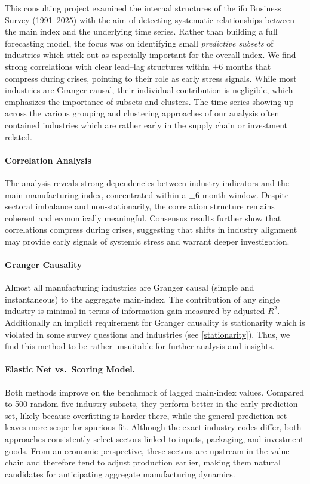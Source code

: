 This consulting project examined the internal structures of the ifo Business Survey (1991–2025) with the aim of detecting systematic relationships between the main index and the underlying time series. Rather than building a full forecasting model, the focus was on identifying small \emph{predictive subsets} of industries which stick out as especially important for the overall index. We find strong correlations with clear lead–lag structures within $\pm6$ months that compress during crises, pointing to their role as early stress signals. While most industries are Granger causal, their individual contribution is negligible, which emphasizes the importance of subsets and clusters. The time series showing up across the various grouping and clustering approaches of our analysis often contained industries which are rather early in the supply chain or investment related. 

\paragraph{Correlation Analysis}
The analysis reveals strong dependencies between industry indicators and the main manufacturing index, concentrated within a $\pm6$ month window. Despite sectoral imbalance and non-stationarity, the correlation structure remains coherent and economically meaningful. Consensus results further show that correlations compress during crises, suggesting that shifts in industry alignment may provide early signals of systemic stress and warrant deeper investigation.

\paragraph{Granger Causality}
Almost all manufacturing industries are Granger causal (simple and instantaneous) to the aggregate main-index. The contribution of any single industry is minimal in terms of information gain measured by adjusted $R^2$. Additionally an implicit requirement for Granger causality is stationarity which is violated in some survey questions and industries (see \ref{stationarity}). Thus, we find this method to be rather unsuitable for further analysis and insights. 

\paragraph{Elastic Net vs.\ Scoring Model.}
Both methods improve on the benchmark of lagged main-index values. Compared to 500 random five-industry subsets, they perform better in the early prediction set, likely because overfitting is harder there, while the general prediction set leaves more scope for spurious fit. Although the exact industry codes differ, both approaches consistently select sectors linked to inputs, packaging, and investment goods. From an economic perspective, these sectors are upstream in the value chain and therefore tend to adjust production earlier, making them natural candidates for anticipating aggregate manufacturing dynamics.

